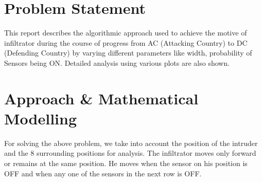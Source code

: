 \documentclass[12pt]{article}
\begin{document}
\maketitle

\section{Problem Statement}
This report describes the algorithmic approach used to achieve the motive of infiltrator during the course of progress from AC (Attacking Country) to DC (Defending Country) by varying different parameters like width, probability of Sensors being ON. Detailed analysis using various plots are also shown. 


\section{Approach \& Mathematical Modelling}
For solving the above problem, we take into account the position of the intruder and the 8 surrounding positions for analysis. The infiltrator moves only forward or remains at the same position. He moves when the sensor on his position is OFF and when any one of the sensors in the next row is OFF.
\end{document}
